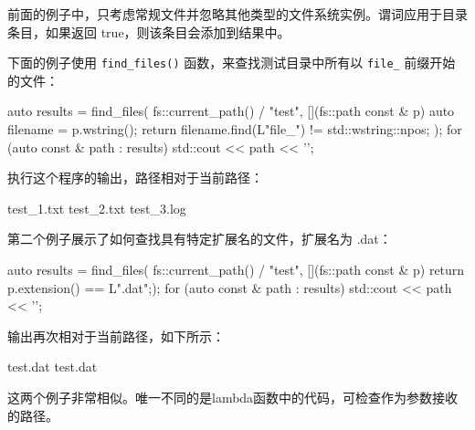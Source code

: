 前面的例子中，只考虑常规文件并忽略其他类型的文件系统实例。谓词应用于目录条目，如果返回 true，则该条目会添加到结果中。

下面的例子使用 \verb|find_files()| 函数，来查找测试目录中所有以 \verb|file_| 前缀开始的文件：

\begin{cpp}
auto results = find_files(
        fs::current_path() / "test",
        [](fs::path const & p) {
    auto filename = p.wstring();
    return filename.find(L"file_") != std::wstring::npos;
});
for (auto const & path : results)
{
    std::cout << path << '\n';
}
\end{cpp}

执行这个程序的输出，路径相对于当前路径：

\begin{shell}
test\file_1.txt
test\file_2.txt
test\file_3.log
\end{shell}

第二个例子展示了如何查找具有特定扩展名的文件，扩展名为 .dat：

\begin{cpp}
auto results = find_files(
        fs::current_path() / "test",
        [](fs::path const & p) {
            return p.extension() == L".dat";});
for (auto const & path : results)
{
    std::cout << path << '\n';
}
\end{cpp}

输出再次相对于当前路径，如下所示：

\begin{shell}
test\data.dat
test\data\output.dat
\end{shell}

这两个例子非常相似。唯一不同的是lambda函数中的代码，可检查作为参数接收的路径。


